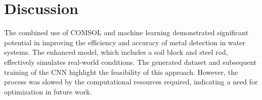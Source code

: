 \chapter{Discussion}

\noindent

The combined use of COMSOL and machine learning demonstrated significant potential in improving the efficiency and accuracy of metal detection in water systems. The enhanced model, which includes a soil block and steel rod, effectively simulates real-world conditions. The generated dataset and subsequent training of the CNN highlight the feasibility of this approach. However, the process was slowed by the computational resources required, indicating a need for optimization in future work.

% 				
% 




